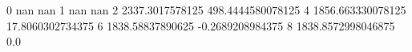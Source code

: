 0 nan nan
1 nan nan
2 2337.3017578125 498.4444580078125
4 1856.663330078125 17.8060302734375
6 1838.58837890625 -0.2689208984375
8 1838.8572998046875 0.0
